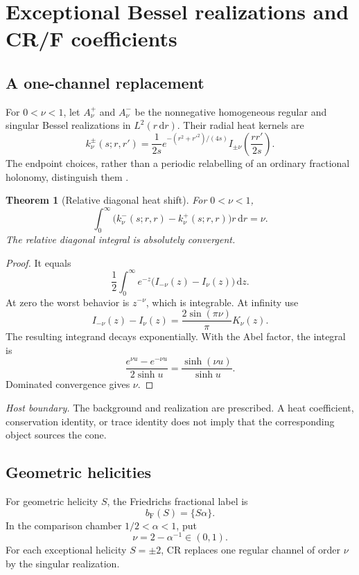 \documentclass[11pt,a4paper]{article}
\newcommand{\dd}{\mathrm d}
\newcommand{\Fr}{\mathrm F}
\theoremstyle{plain}
\newtheorem{theorem}{Theorem}[section]
\theoremstyle{definition}
\theoremstyle{remark}
\numberwithin{equation}{section}
\newcommand{\nonsource}{%
  \par\smallskip\noindent
  \emph{Host boundary.}
  The background and realization are prescribed.
  A heat coefficient, conservation identity, or trace identity does
  not imply that the corresponding object sources the cone.%
}
\begin{document}
\section{Exceptional Bessel realizations and CR/F coefficients}
\label{sec:branches}

\subsection{A one-channel replacement}

For \(0<\nu<1\), let \(A_\nu^+\) and \(A_\nu^-\) be the
nonnegative homogeneous regular and singular Bessel realizations
in \(L^2(r\,\dd r)\). Their radial heat kernels are
\[
 k_\nu^\pm(s;r,r')
 =\frac1{2s}e^{-(r^2+r'^2)/(4s)}
          I_{\pm\nu}\!\left(\frac{rr'}{2s}\right).
\]
The endpoint choices, rather than a periodic relabelling of an
ordinary fractional holonomy, distinguish them
\cite{DerezinskiRichard}.

\begin{theorem}[Relative diagonal heat shift]
\label{thm:flip}
For \(0<\nu<1\),
\begin{equation}
 \int_0^\infty
 \bigl(k_\nu^-(s;r,r)-k_\nu^+(s;r,r)\bigr)r\,\dd r
 =\nu.
 \label{eq:flip}
\end{equation}
The relative diagonal integral is absolutely convergent.
\end{theorem}

\begin{proof}
It equals
\[
 \frac12\int_0^\infty
 e^{-z}\bigl(I_{-\nu}(z)-I_\nu(z)\bigr)\,\dd z.
\]
At zero the worst behavior is \(z^{-\nu}\), which is integrable.
At infinity use
\[
 I_{-\nu}(z)-I_\nu(z)
 =\frac{2\sin(\pi\nu)}{\pi}K_\nu(z).
\]
The resulting integrand decays exponentially.
With the Abel factor, the integral is
\[
 \frac{e^{\nu u}-e^{-\nu u}}{2\sinh u}
 =\frac{\sinh(\nu u)}{\sinh u}.
\]
Dominated convergence gives \(\nu\).
\end{proof}
\nonsource

\subsection{Geometric helicities}

For geometric helicity \(S\), the Friedrichs fractional label is
\[
 b_\Fr(S)=\{S\alpha\}.
\]
In the comparison chamber \(1/2<\alpha<1\), put
\begin{equation}
 \nu=2-\alpha^{-1}\in(0,1).
 \label{eq:nu}
\end{equation}
For each exceptional helicity \(S=\pm2\), CR replaces one regular
channel of order \(\nu\) by the singular realization.
\end{document}
